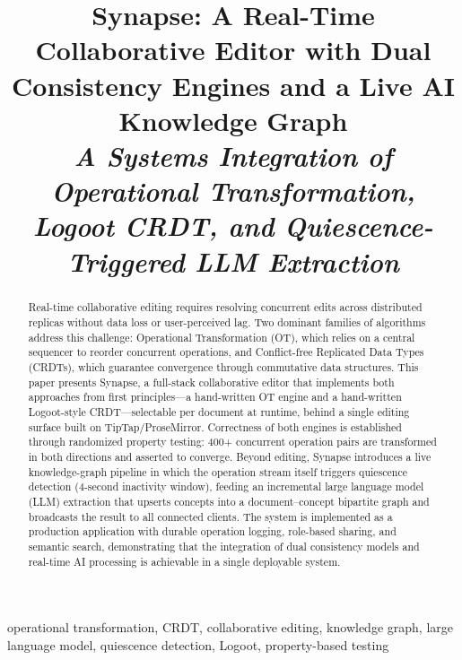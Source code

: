 \documentclass[conference]{IEEEtran}
\begin{document}
\title{Synapse: A Real-Time Collaborative Editor with Dual Consistency Engines and a Live AI Knowledge Graph\\
{\footnotesize \textit{A Systems Integration of Operational Transformation, Logoot CRDT, and Quiescence-Triggered LLM Extraction}}
}

\author{
}

\maketitle

\begin{abstract}
Real-time collaborative editing requires resolving concurrent edits across distributed replicas without data loss or user-perceived lag. Two dominant families of algorithms address this challenge: Operational Transformation (OT), which relies on a central sequencer to reorder concurrent operations, and Conflict-free Replicated Data Types (CRDTs), which guarantee convergence through commutative data structures. This paper presents Synapse, a full-stack collaborative editor that implements both approaches from first principles---a hand-written OT engine and a hand-written Logoot-style CRDT---selectable per document at runtime, behind a single editing surface built on TipTap/ProseMirror. Correctness of both engines is established through randomized property testing: 400+ concurrent operation pairs are transformed in both directions and asserted to converge. Beyond editing, Synapse introduces a live knowledge-graph pipeline in which the operation stream itself triggers quiescence detection (4-second inactivity window), feeding an incremental large language model (LLM) extraction that upserts concepts into a document--concept bipartite graph and broadcasts the result to all connected clients. The system is implemented as a production application with durable operation logging, role-based sharing, and semantic search, demonstrating that the integration of dual consistency models and real-time AI processing is achievable in a single deployable system.
\end{abstract}

\begin{IEEEkeywords}
operational transformation, CRDT, collaborative editing, knowledge graph, large language model, quiescence detection, Logoot, property-based testing
\end{IEEEkeywords}
\end{document}

